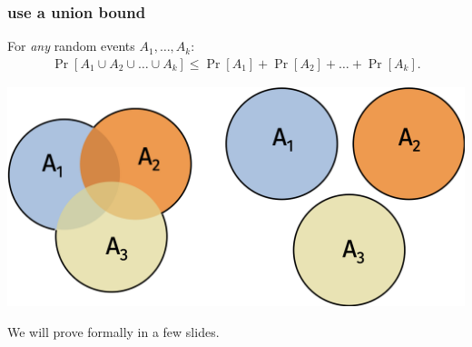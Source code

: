 \documentclass[handout,compress]{beamer}
\newcommand{\E}{\mathbb{E}}
\begin{document}
\begin{frame}
	\frametitle{use a union bound}
	\begin{lemma}
		For \emph{any} random events $A_1, \ldots, A_k$:
		\begin{align*}
			\Pr[A_1 \cup A_2 \cup \ldots \cup A_k] \leq \Pr[A_1] + \Pr[A_2] + \ldots +\Pr[A_k].
		\end{align*}
	\end{lemma}
	\begin{center}
		\includegraphics[width=.8\textwidth]{union_bound_proof.png}
	\end{center}
We will prove formally in a few slides.
\end{frame}

\end{document}
